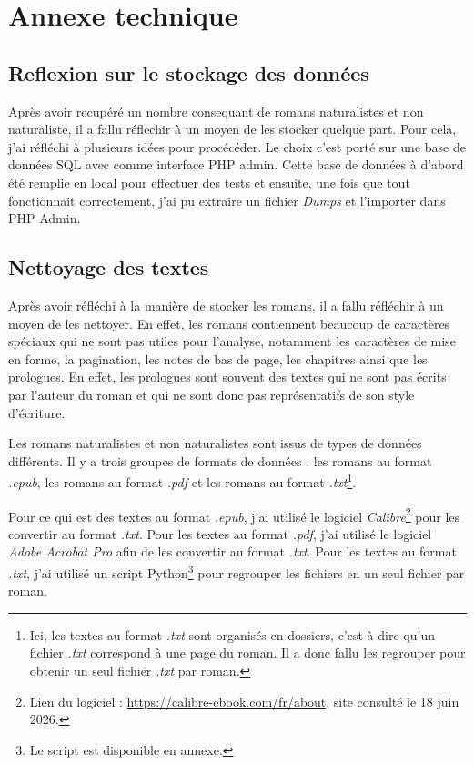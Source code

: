 \chapter*{Annexe technique }

\section{Reflexion sur le stockage des données}

Après avoir recupéré un nombre consequant de romans naturalistes et non naturaliste, il a fallu réflechir à un moyen de les stocker quelque part. Pour cela, j'ai réfléchi à plusieurs idées pour procécéder. Le choix c'est porté sur une base de données SQL avec comme interface PHP admin. Cette base de données à d'abord été remplie en local pour effectuer des tests et ensuite, une fois que tout fonctionnait correctement, j'ai pu extraire un fichier \textsl{Dumps} et l'importer dans PHP Admin.

\section{Nettoyage des textes}

Après avoir réfléchi à la manière de stocker les romans, il a fallu réfléchir à un moyen de les nettoyer. En effet, les romans contiennent beaucoup de caractères spéciaux qui ne sont pas utiles pour l'analyse, notamment les caractères de mise en forme, la pagination, les notes de bas de page, les chapitres ainsi que les prologues. En effet, les prologues sont souvent des textes qui ne sont pas écrits par l'auteur du roman et qui ne sont donc pas représentatifs de son style d'écriture.

Les romans naturalistes et non naturalistes sont issus de types de données différents. Il y a trois groupes de formats de données : les romans au format \textsl{.epub}, les romans au format \textsl{.pdf} et les romans au format \textsl{.txt}\footnote{Ici, les textes au format \textsl{.txt} sont organisés en dossiers, c'est-à-dire qu'un fichier \textsl{.txt} correspond à une page du roman. Il a donc fallu les regrouper pour obtenir un seul fichier \textsl{.txt} par roman.}.

Pour ce qui est des textes au format \textsl{.epub}, j'ai utilisé le logiciel \textsl{Calibre}\footnote{Lien du logiciel : \href{https://calibre-ebook.com/fr/about}{https://calibre-ebook.com/fr/about}, site consulté le 18 juin 2026.} pour les convertir au format \textsl{.txt}. Pour les textes au format \textsl{.pdf}, j'ai utilisé le logiciel \textsl{Adobe Acrobat Pro} afin de les convertir au format \textsl{.txt}. Pour les textes au format \textsl{.txt}, j'ai utilisé un script Python\footnote{Le script est disponible en annexe.} pour regrouper les fichiers en un seul fichier par roman.


